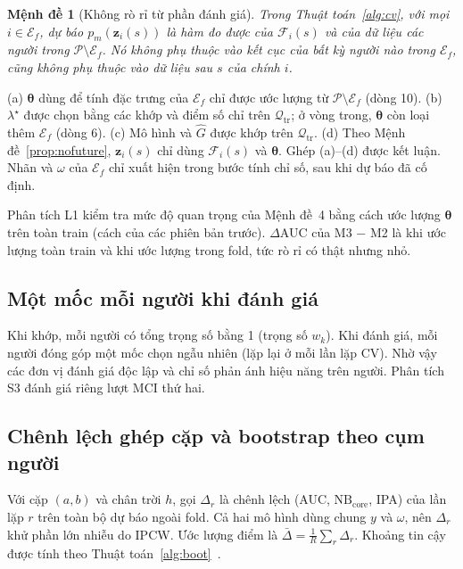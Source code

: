 \documentclass[journal]{IEEEtran}
\newtheorem{proposition}{Mệnh đề}
\begin{document}
\begin{proposition}[Không rò rỉ từ phần đánh giá]
Trong Thuật toán~\ref{alg:cv}, với mọi $i\in\mathcal E_f$, dự báo $p_m(\bm z_i(s))$ là hàm đo được của $\mathcal F_i(s)$ và của dữ liệu các người trong $\mathcal P\setminus\mathcal E_f$. Nó không phụ thuộc vào kết cục của bất kỳ người nào trong $\mathcal E_f$, cũng không phụ thuộc vào dữ liệu sau $s$ của chính $i$.
\end{proposition}
\begin{IEEEproof}
(a) $\bm\theta$ dùng để tính đặc trưng của $\mathcal E_f$ chỉ được ước lượng từ $\mathcal P\setminus\mathcal E_f$ (dòng 10). (b) $\lambda^\star$ được chọn bằng các khớp và điểm số chỉ trên $\mathcal Q_{\text{tr}}$; ở vòng trong, $\bm\theta$ còn loại thêm $\mathcal E_f$ (dòng 6). (c) Mô hình và $\hat G$ được khớp trên $\mathcal Q_{\text{tr}}$. (d) Theo Mệnh đề~\ref{prop:nofuture}, $\bm z_i(s)$ chỉ dùng $\mathcal F_i(s)$ và $\bm\theta$. Ghép (a)--(d) được kết luận. Nhãn và $\omega$ của $\mathcal E_f$ chỉ xuất hiện trong bước tính chỉ số, sau khi dự báo đã cố định.
\end{IEEEproof}

Phân tích L1 kiểm tra mức độ quan trọng của Mệnh đề~4 bằng cách ước lượng $\bm\theta$ trên toàn train (cách của các phiên bản trước). $\Delta$AUC của M3 − M2 là  khi ước lượng toàn train và  khi ước lượng trong fold, tức rò rỉ có thật nhưng nhỏ.

\subsection{Một mốc mỗi người khi đánh giá}
Khi khớp, mỗi người có tổng trọng số bằng 1 (trọng số $w_k$). Khi đánh giá, mỗi người đóng góp một mốc chọn ngẫu nhiên (lặp lại ở mỗi lần lặp CV). Nhờ vậy các đơn vị đánh giá độc lập và chỉ số phản ánh hiệu năng trên người. Phân tích S3 đánh giá riêng lượt MCI thứ hai.

\subsection{Chênh lệch ghép cặp và bootstrap theo cụm người}
Với cặp $(a,b)$ và chân trời $h$, gọi $\Delta_r$ là chênh lệch (AUC, $\mathrm{NB}_{\text{core}}$, IPA) của lần lặp $r$ trên toàn bộ dự báo ngoài fold. Cả hai mô hình dùng chung $y$ và $\omega$, nên $\Delta_r$ khử phần lớn nhiễu do IPCW. Ước lượng điểm là $\bar\Delta=\frac1R\sum_r\Delta_r$. Khoảng tin cậy được tính theo Thuật toán~\ref{alg:boot}~\cite{efron1993}.
\end{document}
